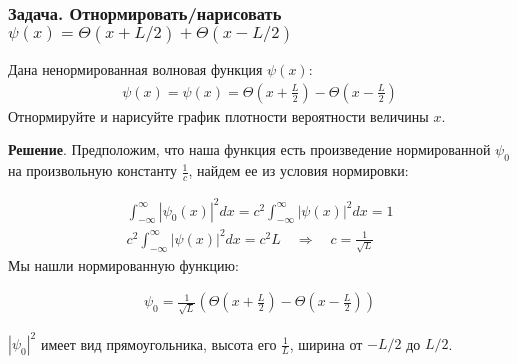 \subsubsection{Задача. Отнормировать/нарисовать $\psi(x)=\Theta(x+L/2)+\Theta(x-L/2)$}


Дана ненормированная волновая функция $\psi(x)$:
\begin{gather*}
\psi(x)=\psi(x)=\Theta\left(x+\frac{L}{2}\right)-\Theta\left(x-\frac{L}{2}\right)
\end{gather*}
Отнормируйте и нарисуйте график плотности вероятности величины $x$.

\textbf{Решение}. Предположим, что наша функция есть произведение нормированной $\psi_0$ на произвольную константу $\frac{1}{c}$, найдем ее из условия нормировки:

\begin{gather*}
\int_{-\infty}^{\infty}|\psi_0(x)|^2 dx=
c^2\int_{-\infty}^{\infty}|\psi(x)|^2 dx=1\\
c^2\int_{-\infty}^{\infty}|\psi(x)|^2 dx=
c^2 L \quad\Rightarrow\quad c=\frac{1}{\sqrt{L}}
\end{gather*}
Мы нашли нормированную функцию:

\begin{gather*}
\psi_0=\frac{1}{\sqrt{L}}\left(
	\Theta\left(x+\frac{L}{2}\right)-\Theta\left(x-\frac{L}{2}\right)
\right)
\end{gather*}

$|\psi_0|^2$ имеет вид прямоугольника, высота его $\frac{1}{L}$, ширина от $-L/2$ до $L/2$.